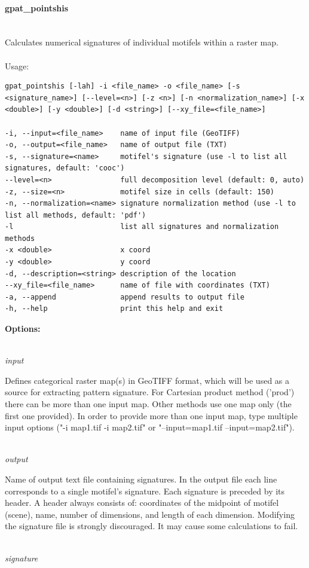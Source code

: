 \documentclass[12pt,margin=0.5in]{article}
\newcommand{\newparagraph}[1]{\paragraph{#1}\mbox{}\\}
\newcommand{\newoption}[1]{\mbox{}\\{\it #1}}
\begin{document}
\newparagraph{gpat\_pointshis}
Calculates numerical signatures of individual motifels within a raster map.
\\\\
Usage:
\begin{lstlisting}[frame=single]
gpat_pointshis [-lah] -i <file_name> -o <file_name> [-s <signature_name>] [--level=<n>] [-z <n>] [-n <normalization_name>] [-x <double>] [-y <double>] [-d <string>] [--xy_file=<file_name>]

-i, --input=<file_name>    name of input file (GeoTIFF)
-o, --output=<file_name>   name of output file (TXT)
-s, --signature=<name>     motifel's signature (use -l to list all signatures, default: 'cooc')
--level=<n>                full decomposition level (default: 0, auto)
-z, --size=<n>             motifel size in cells (default: 150)
-n, --normalization=<name> signature normalization method (use -l to list all methods, default: 'pdf')
-l                         list all signatures and normalization methods
-x <double>                x coord
-y <double>                y coord
-d, --description=<string> description of the location
--xy_file=<file_name>      name of file with coordinates (TXT)
-a, --append               append results to output file
-h, --help                 print this help and exit
\end{lstlisting}

{\bf Options:}

\newoption{input}

Defines categorical raster map(s) in GeoTIFF format, which will be used as a source for extracting pattern signature. For Cartesian product method ('prod') there can be more than one input map. Other methods use one map only (the first one provided). In order to provide more than one input map, type multiple input options ("-i map1.tif -i map2.tif" or "--input=map1.tif --input=map2.tif").

\newoption{output}

Name of output text file containing signatures. In the output file each line corresponds to a single motifel's signature. Each signature is preceded by its header. A header always consists of: coordinates of the midpoint of motifel (scene), name, number of dimensions, and length of each dimension. Modifying the signature file is strongly discouraged. It may cause some calculations to fail.

\newoption{signature}
\end{document}
